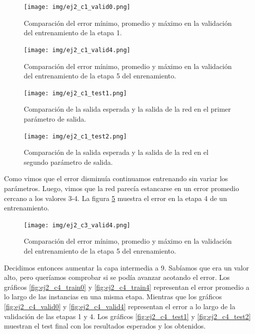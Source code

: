 \documentclass[onecolumn,10pt]{article}
\begin{document}
\begin{figure}[H]
  \centering
  \texttt{[image: img/ej2\_c1\_valid0.png]}
  \caption{Comparación del error mínimo, promedio y máximo en la validación del entrenamiento de la etapa 1.}
  \label{fig:ej2_c1_valid0}
\end{figure}

\begin{figure}[H]
  \centering
  \texttt{[image: img/ej2\_c1\_valid4.png]}
  \caption{Comparación del error mínimo, promedio y máximo en la validación del entrenamiento de la etapa 5 del enrenamiento.}
  \label{fig:ej2_c1_valid4}
\end{figure}


\begin{figure}[H]
  \centering
  \texttt{[image: img/ej2\_c1\_test1.png]}
  \caption{Comparación de la salida esperada y la salida de la red en el primer parámetro de salida.}
  \label{fig:ej2_c1_test1}
\end{figure}

\begin{figure}[H]
  \centering
  \texttt{[image: img/ej2\_c1\_test2.png]}
  \caption{Comparación de la salida esperada y la salida de la red en el segundo parámetro de salida.}
  \label{fig:ej2_c1_test2}
\end{figure}


Como vimos que el error disminuía continuamos entrenando sin variar los parámetros. Luego, vimos que la red parecía estancarse en un error promedio cercano a los valores 3-4. La figura \ref{fig:ej2_c3_valid4} muestra el error en la etapa 4 de un entrenamiento.

\begin{figure}[H]
  \centering
  \texttt{[image: img/ej2\_c3\_valid4.png]}
  \caption{Comparación del error mínimo, promedio y máximo en la validación del entrenamiento de la etapa 5 del enrenamiento.}
  \label{fig:ej2_c3_valid4}
\end{figure}


Decidimos entonces aumentar la capa intermedia a 9. Sabíamos que era un valor alto, pero queríamos comprobar si se podía avanzar acotando el error. Los gráficos \ref{fig:ej2_c4_train0} y \ref{fig:ej2_c4_train4} representan el error promedio a lo largo de las instancias en una misma etapa. Mientras que los gráficos \ref{fig:ej2_c4_valid0} y \ref{fig:ej2_c4_valid4} representan el error a lo largo de la validación de las etapas 1 y 4. Los gráficos \ref{fig:ej2_c4_test1} y \ref{fig:ej2_c4_test2} muestran el test final con los resultados esperados y los obtenidos.
\end{document}
